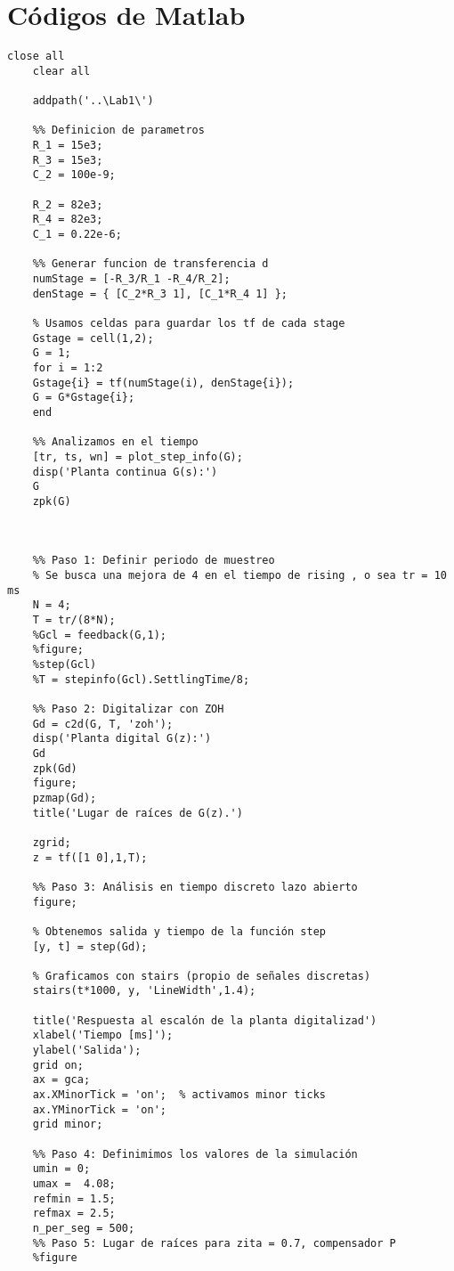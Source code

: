 \onecolumn
\appendices
\section{Códigos de Matlab}

\begin{lstlisting}[style=matlabstyle,caption={Primera hoja de cálculos utilizada.},label={matlab:calculo1}]
	close all
	clear all
	
	addpath('..\Lab1\')
	
	%% Definicion de parametros
	R_1 = 15e3;
	R_3 = 15e3;
	C_2 = 100e-9;
	
	R_2 = 82e3;
	R_4 = 82e3;
	C_1 = 0.22e-6;
	
	%% Generar funcion de transferencia d
	numStage = [-R_3/R_1 -R_4/R_2];
	denStage = { [C_2*R_3 1], [C_1*R_4 1] };
	
	% Usamos celdas para guardar los tf de cada stage
	Gstage = cell(1,2);
	G = 1;
	for i = 1:2
	Gstage{i} = tf(numStage(i), denStage{i});
	G = G*Gstage{i};
	end
	
	%% Analizamos en el tiempo
	[tr, ts, wn] = plot_step_info(G);
	disp('Planta continua G(s):')
	G
	zpk(G)
	
	
	
	%% Paso 1: Definir periodo de muestreo
	% Se busca una mejora de 4 en el tiempo de rising , o sea tr = 10 ms
	N = 4; 
	T = tr/(8*N);
	%Gcl = feedback(G,1);
	%figure;
	%step(Gcl)
	%T = stepinfo(Gcl).SettlingTime/8;
	
	%% Paso 2: Digitalizar con ZOH
	Gd = c2d(G, T, 'zoh');
	disp('Planta digital G(z):')
	Gd
	zpk(Gd)
	figure;
	pzmap(Gd);
	title('Lugar de raíces de G(z).')
	
	zgrid;
	z = tf([1 0],1,T);
	
	%% Paso 3: Análisis en tiempo discreto lazo abierto
	figure;
	
	% Obtenemos salida y tiempo de la función step
	[y, t] = step(Gd);
	
	% Graficamos con stairs (propio de señales discretas)
	stairs(t*1000, y, 'LineWidth',1.4);
	
	title('Respuesta al escalón de la planta digitalizad')
	xlabel('Tiempo [ms]');
	ylabel('Salida');
	grid on;
	ax = gca;
	ax.XMinorTick = 'on';  % activamos minor ticks
	ax.YMinorTick = 'on';
	grid minor;
	
	%% Paso 4: Definimimos los valores de la simulación
	umin = 0;
	umax =  4.08;
	refmin = 1.5;
	refmax = 2.5;
	n_per_seg = 500;
	%% Paso 5: Lugar de raíces para zita = 0.7, compensador P
	%figure
	

\end{lstlisting}
